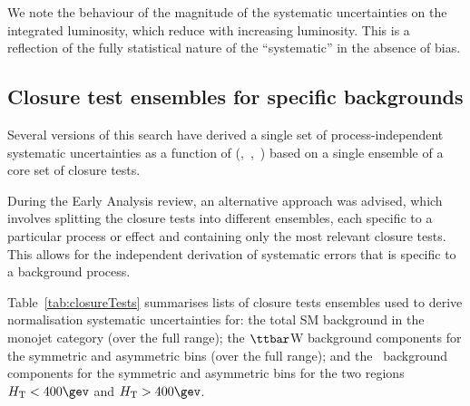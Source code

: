 We note the behaviour of the magnitude of the systematic uncertainties
on the integrated luminosity, which reduce with increasing
luminosity. This is a reflection of the fully statistical nature of
the ``systematic'' in the absence of bias.

\subsection{Closure test ensembles for specific backgrounds\label{sec:closure-split}}

Several versions of this search have derived a single set of
process-independent systematic uncertainties as a function of
(\njet,~\nb,~\scalht) based on a single ensemble of a core set of
closure tests. 

During the Early Analysis review, an alternative approach was advised,
which involves splitting the closure tests into different ensembles,
each specific to a particular process or effect and containing only
the most relevant closure tests. This allows for the independent
derivation of systematic errors that is specific to a background
process.

Table~\ref{tab:closureTests} summarises lists of closure tests
ensembles used to derive normalisation systematic uncertainties for:
the total SM background in the monojet category (over the full \scalht
range); the $\ttbar$W background components for the symmetric and
asymmetric \njet bins (over the full \scalht range); and the \znunu\
background components for the symmetric and asymmetric \njet bins for
the two regions $\scalht < 400\gev$ and $\scalht > 400\gev$.

